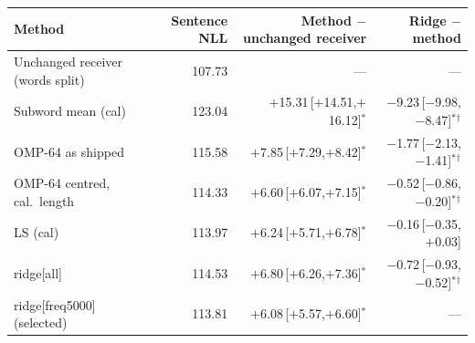 \begin{tabular}{lrrr}
\toprule
Method & Sentence NLL & Method $-$ unchanged receiver & Ridge $-$ method \\
\midrule
Unchanged receiver (words split) & 107.73 & --- & --- \\
Subword mean (cal) & 123.04 & $+$15.31\,[$+$14.51,$+$16.12]$^{*}$ & $-$9.23\,[$-$9.98,$-$8.47]$^{*}$$^{\dagger}$ \\
OMP-64 as shipped & 115.58 & $+$7.85\,[$+$7.29,$+$8.42]$^{*}$ & $-$1.77\,[$-$2.13,$-$1.41]$^{*}$$^{\dagger}$ \\
OMP-64 centred, cal.\ length & 114.33 & $+$6.60\,[$+$6.07,$+$7.15]$^{*}$ & $-$0.52\,[$-$0.86,$-$0.20]$^{*}$$^{\dagger}$ \\
LS (cal) & 113.97 & $+$6.24\,[$+$5.71,$+$6.78]$^{*}$ & $-$0.16\,[$-$0.35,$+$0.03] \\
ridge[all] & 114.53 & $+$6.80\,[$+$6.26,$+$7.36]$^{*}$ & $-$0.72\,[$-$0.93,$-$0.52]$^{*}$$^{\dagger}$ \\
ridge[freq5000] (selected) & 113.81 & $+$6.08\,[$+$5.57,$+$6.60]$^{*}$ & --- \\
\bottomrule
\end{tabular}
